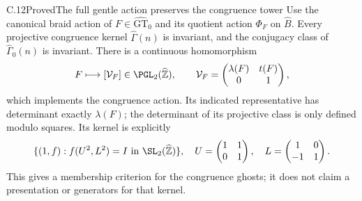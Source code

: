 \begin{statement}{C.12}{Proved}{The full gentle action preserves the congruence tower}
Use the canonical braid action of $F\in\widehat{\mathrm{GT}}_0$
and its quotient action $\Phi_F$ on $\widehat B$.
Every projective congruence kernel $\widehat\Gamma(n)$ is invariant,
and the conjugacy class of $\widehat\Gamma_0(n)$ is invariant.
There is a continuous homomorphism
\[
 F\longmapsto\left[\mathcal V_F\right]\in
       \PGL_2(\widehat{\mathbb Z}),\qquad
 \mathcal V_F=\begin{pmatrix}\lambda(F)&t(F)\\0&1\end{pmatrix},
\]
which implements the congruence action. Its indicated representative
has determinant exactly $\lambda(F)$; the determinant of its
projective class is only defined modulo squares. Its kernel is
explicitly
\[
 \{(1,f):f(U^2,L^2)=I\text{ in }
                \SL_2(\widehat{\mathbb Z})\},
 \quad
 U=\begin{pmatrix}1&1\\0&1\end{pmatrix},\quad
 L=\begin{pmatrix}1&0\\-1&1\end{pmatrix}.
\]
This gives a membership criterion for the congruence ghosts;
it does not claim a presentation or generators for that kernel.
\end{statement}
